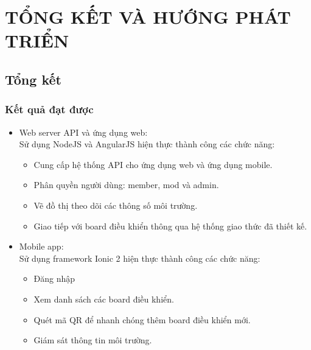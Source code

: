 \documentclass[a4paper,12pt,oneside]{article}
\begin{document}
\newpage
\section{TỔNG KẾT VÀ HƯỚNG PHÁT TRIỂN}
\subsection{Tổng kết}
	\subsubsection{Kết quả đạt được}
	\begin{itemize}
	\item Web server API và ứng dụng web: \\
	Sử dụng NodeJS và AngularJS hiện thực thành công các chức năng: 
		\begin{itemize}
			\item Cung cấp hệ thống API cho ứng dụng web và ứng dụng mobile. 

			\item Phân quyền người dùng: member, mod và admin. 

			\item Vẽ đồ thị theo dõi các thông số môi trường. 

			\item Giao tiếp với board điều khiển thông qua hệ thống giao thức đã thiết kế. 
		\end{itemize}

	\item Mobile app: \\
	Sử dụng framework Ionic 2 hiện thực thành công các chức năng: 
		\begin{itemize}
			\item Đăng nhập 

			\item Xem danh sách các board điều khiển. 

			\item Quét mã QR để nhanh chóng thêm board điều khiển mới. 

			\item Giám sát thông tin môi trường. 


\end{itemize}
\end{itemize}
\end{document}
